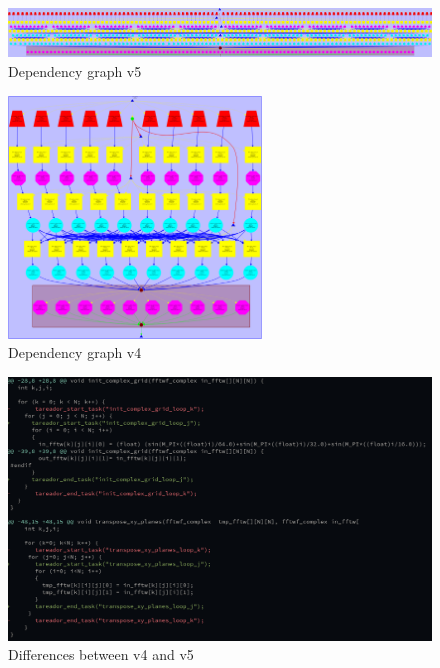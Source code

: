 \begin{figure}[H]%
    \centering
    \includegraphics[width=\textwidth]{data/3dfft_/plots/cap.png}
    \caption{Dependency graph v5}%
    \label{fig:depen_v5}
\end{figure}
\begin{figure}[H]%
    \centering
    \includegraphics[width=0.6\textwidth]{data/3dfft_/plots/dependency_graph_v4.pdf.png}
    \caption{Dependency graph v4}%
    \label{fig:depen_v4}
\end{figure}

\begin{figure}[H]%
    \label{fig:diff}
    \centering
    \includegraphics[width=\textwidth]{./data/3dfft_/plots/diff.png}
    \caption{Differences between v4 and v5}%
\end{figure}

